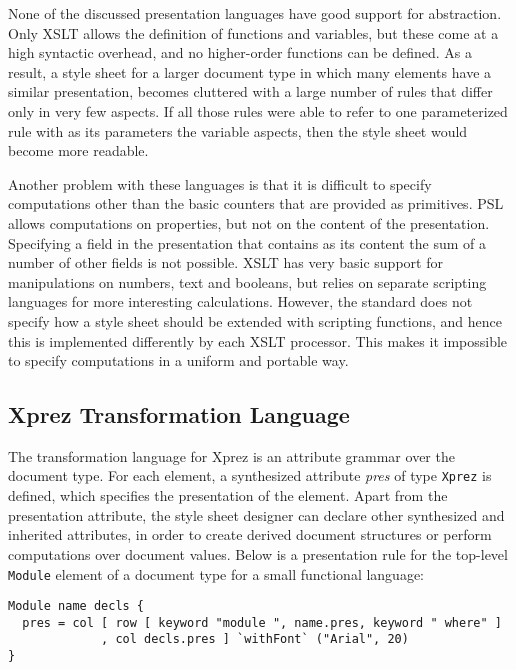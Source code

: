  None of the discussed presentation languages have good support for abstraction. Only XSLT allows the definition of functions and variables, but these come at a high syntactic overhead, and no higher-order functions can be defined. As a result, a style sheet for a larger document type in which many elements have a similar presentation, becomes cluttered with a large number of rules that differ only in very few aspects. If all those rules were able to refer to one parameterized rule with as its parameters the variable aspects, then the style sheet would become more readable.

Another problem with these languages is that it is difficult to specify computations other than the basic counters that are provided as primitives. PSL allows computations on properties, but not on the content of the presentation. Specifying a field in the presentation that contains as its content the sum of a number of other fields is not possible. XSLT has very basic support for manipulations on numbers, text and booleans, but relies on separate scripting languages for more interesting calculations. However, the standard does not specify how a style sheet should be extended with scripting functions, and hence this is implemented differently by each XSLT processor. This makes it impossible to specify computations in a uniform and portable way.


%									
\subsection{{\sc Xprez} Transformation Language}

The transformation language for {\sc Xprez} is an attribute grammar over the document type. For each element, a synthesized attribute {\em pres} of type \texttt{Xprez} is defined, which specifies the presentation of the element. Apart from the presentation attribute, the style sheet designer can declare other synthesized and inherited attributes, in order to create derived document structures or perform computations over document values. Below is a presentation rule for the top-level \texttt{Module} element of a document type for a small functional language:

\begin{small}
\begin{verbatim}
Module name decls {
  pres = col [ row [ keyword "module ", name.pres, keyword " where" ]   
             , col decls.pres ] `withFont` ("Arial", 20)
}
\end{verbatim}
\end{small}

